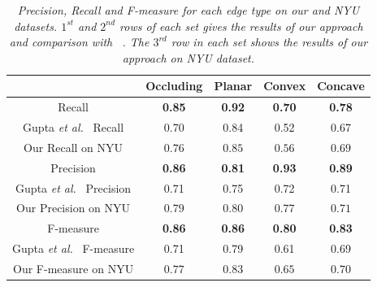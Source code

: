 \begin{table}[h]
\begin{center}
\caption{\it Precision, Recall and F-measure for each edge type on our and NYU datasets. $1^{st}$ and $2^{nd}$ 
rows of each set gives the results of our approach and comparison with ~\cite{gupta13Perceptual}. The $3^{rd}$ 
row in each set shows the results of our approach on NYU dataset.}
\label{table:evaluation}
       \begin{tabular}{|c||c|c|c|c|}
       \hline
        & Occluding & Planar & Convex & Concave \\ 
        \hline 
        \hline
	Recall & {\bf 0.85} & {\bf 0.92} & {\bf 0.70} & {\bf 0.78} \\ \hline 
	Gupta {\em et al.}~\cite{gupta13Perceptual} Recall & 0.70 & 0.84 & 0.52 & 0.67 \\ \hline 
	Our Recall on NYU & $0.76$ & $0.85$ & $0.56$ & $0.69$ \\ \hline  \hline
	Precision &  {\bf 0.86 } & {\bf 0.81} & {\bf 0.93} &{\bf 0.89} \\ \hline 
	Gupta {\em et al.}~\cite{gupta13Perceptual} Precision & 0.71 & 0.75 & 0.72 & 0.71 \\ \hline
	Our Precision on NYU & $0.79$ & $0.80$ & $0.77$ & $0.71$ \\ \hline   \hline
	F-measure & {\bf 0.86 } &  {\bf 0.86 } &  {\bf 0.80 } &  {\bf 0.83 } \\ \hline 
	Gupta {\em et al.}~\cite{gupta13Perceptual} F-measure & 0.71 & 0.79 & 0.61 & 0.69 \\ \hline 
	Our F-measure on NYU & $0.77$ & $0.83$ & $0.65$ & $0.70$ \\ \hline 
\end{tabular}
\end{center}
\end{table}
\vspace{-5mm}

